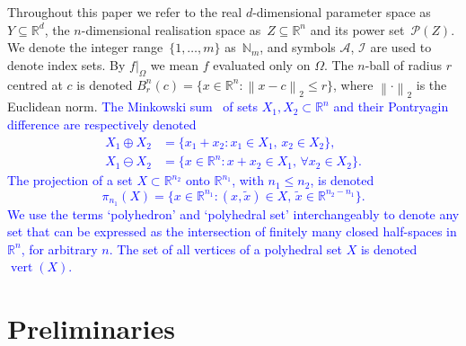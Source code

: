 \documentclass[smallextended]{svjour3}       %
\numberwithin{equation}{section}
\providecommand{\norm}[1]{\left\|#1\right\|}
\DeclareMathOperator{\vertices}{vert}
\newcommand{\revision}[1]{\textcolor{blue}{#1}}
\begin{document}
Throughout this paper we refer to the real $d$-dimensional parameter space as $Y\subseteq\mathbb R^d$, the $n$-dimensional realisation space as~$Z\subseteq\mathbb R^n$ and its power set~$\mathscr P(Z)$.
%
We denote the integer range~$\{1,\dots,m\}$ as~$\mathbb N_m$, and symbols $\mathcal A$, $\mathcal I$ are used to denote index sets.
%
By $f\vert_\Omega$ we mean $f$ evaluated only on $\Omega$. The $n$-ball of radius $r$ centred at $c$ is denoted $B_r^n(c)=\{x\in\mathbb R^n :\norm{x-c}_2\leq r\}$, where $\norm{\cdot}_2$ is the Euclidean norm.
%
\revision{The Minkowski sum~\cite{Minkowski:1911} of sets $X_1,X_2\subset\mathbb R^n$ and their Pontryagin difference are respectively denoted
\begin{align*}
X_1\oplus X_2 &=\{x_1 + x_2 : x_1\in X_1, \, x_2\in X_2 \} , \\
X_1\ominus X_2 &=\{x\in\mathbb R^n : x + x_2 \in X_1, \, \forall x_2\in X_2\} .
\end{align*}
%
The projection of a set $X\subset \mathbb R^{n_2}$ onto $\mathbb R^{n_1}$, with $n_1\leq n_2$, is denoted 
\[
\pi_{n_1}(X) = \{x\in\mathbb R^{n_1}: (x,\tilde x)\in X, \, \tilde x\in\mathbb R^{n_2-n_1} \}.
\]
%
We use the terms `polyhedron' and `polyhedral set' interchangeably to denote any set that can be expressed as the intersection of finitely many closed half-spaces in $\mathbb{R}^n$, for arbitrary $n$.
The set of all vertices of a polyhedral set $X$ is denoted $\vertices(X)$.}
%
\section{Preliminaries}\label{sec:preliminaries}
\end{document}

